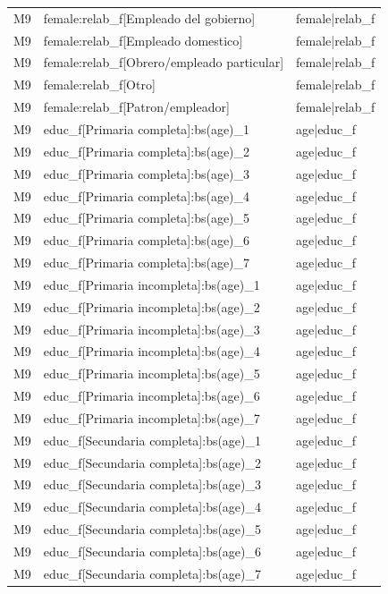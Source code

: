 \begin{longtable}{lll}
M9 & female:relab\_f[Empleado del gobierno] & female|relab\_f \\
M9 & female:relab\_f[Empleado domestico] & female|relab\_f \\
M9 & female:relab\_f[Obrero/empleado particular] & female|relab\_f \\
M9 & female:relab\_f[Otro] & female|relab\_f \\
M9 & female:relab\_f[Patron/empleador] & female|relab\_f \\
M9 & educ\_f[Primaria completa]:bs(age)\_1 & age|educ\_f \\
M9 & educ\_f[Primaria completa]:bs(age)\_2 & age|educ\_f \\
M9 & educ\_f[Primaria completa]:bs(age)\_3 & age|educ\_f \\
M9 & educ\_f[Primaria completa]:bs(age)\_4 & age|educ\_f \\
M9 & educ\_f[Primaria completa]:bs(age)\_5 & age|educ\_f \\
M9 & educ\_f[Primaria completa]:bs(age)\_6 & age|educ\_f \\
M9 & educ\_f[Primaria completa]:bs(age)\_7 & age|educ\_f \\
M9 & educ\_f[Primaria incompleta]:bs(age)\_1 & age|educ\_f \\
M9 & educ\_f[Primaria incompleta]:bs(age)\_2 & age|educ\_f \\
M9 & educ\_f[Primaria incompleta]:bs(age)\_3 & age|educ\_f \\
M9 & educ\_f[Primaria incompleta]:bs(age)\_4 & age|educ\_f \\
M9 & educ\_f[Primaria incompleta]:bs(age)\_5 & age|educ\_f \\
M9 & educ\_f[Primaria incompleta]:bs(age)\_6 & age|educ\_f \\
M9 & educ\_f[Primaria incompleta]:bs(age)\_7 & age|educ\_f \\
M9 & educ\_f[Secundaria completa]:bs(age)\_1 & age|educ\_f \\
M9 & educ\_f[Secundaria completa]:bs(age)\_2 & age|educ\_f \\
M9 & educ\_f[Secundaria completa]:bs(age)\_3 & age|educ\_f \\
M9 & educ\_f[Secundaria completa]:bs(age)\_4 & age|educ\_f \\
M9 & educ\_f[Secundaria completa]:bs(age)\_5 & age|educ\_f \\
M9 & educ\_f[Secundaria completa]:bs(age)\_6 & age|educ\_f \\
M9 & educ\_f[Secundaria completa]:bs(age)\_7 & age|educ\_f \\

\end{longtable}
